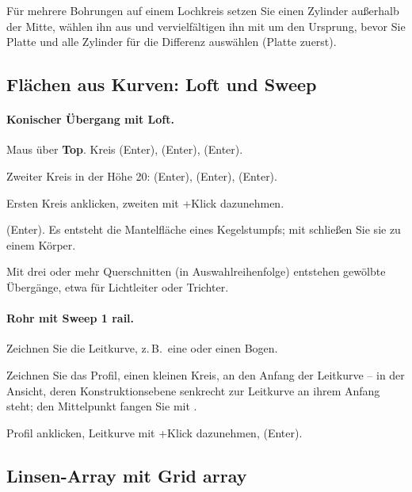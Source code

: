 Für mehrere Bohrungen auf einem Lochkreis setzen Sie einen Zylinder außerhalb der Mitte, wählen
ihn aus und vervielfältigen ihn mit  um den Ursprung, bevor Sie Platte und
alle Zylinder für die Differenz auswählen (Platte zuerst).

\subsection{Flächen aus Kurven: Loft und Sweep}\label{sec:bsp-loft}

\paragraph{Konischer Übergang mit Loft.}
\begin{schritte}
\item Maus über \textbf{Top}. Kreis  (Enter),  (Enter),  (Enter).
\item Zweiter Kreis in der Höhe 20:  (Enter),  (Enter),  (Enter).
\item Ersten Kreis anklicken, zweiten mit +Klick dazunehmen.
\item {} (Enter). Es entsteht die Mantelfläche eines Kegelstumpfs; mit 
  schließen Sie sie zu einem Körper.
\end{schritte}
Mit drei oder mehr Querschnitten (in Auswahlreihenfolge) entstehen gewölbte Übergänge, etwa
für Lichtleiter oder Trichter.

\paragraph{Rohr mit Sweep 1 rail.}
\begin{schritte}
\item Zeichnen Sie die Leitkurve, z.\,B.\ eine  oder einen Bogen.
\item Zeichnen Sie das Profil, einen kleinen Kreis, an den Anfang der Leitkurve -- in der
  Ansicht, deren Konstruktionsebene senkrecht zur Leitkurve an ihrem Anfang steht; den
  Mittelpunkt fangen Sie mit .
\item Profil anklicken, Leitkurve mit +Klick dazunehmen,  (Enter).
\end{schritte}

\subsection{Linsen-Array mit Grid array}\label{sec:bsp-array}

